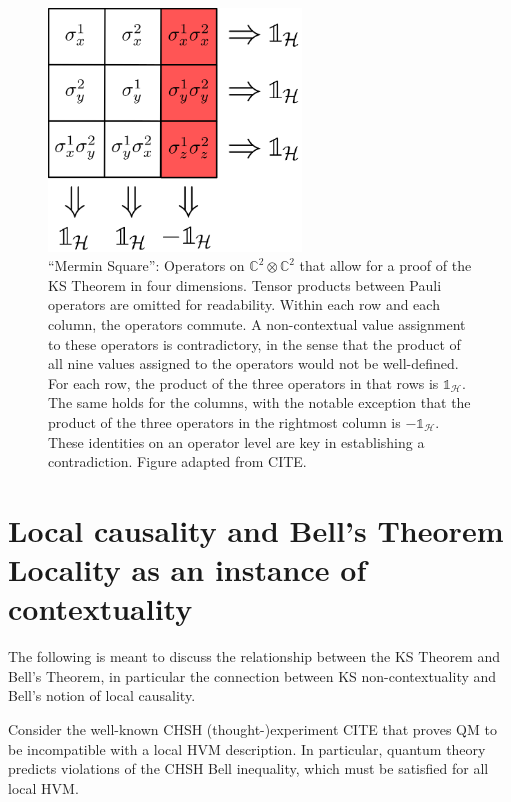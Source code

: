 \begin{figure}
    \centering
    \includegraphics[width=0.6\textwidth]{images/4dim.png}
    \caption{``Mermin Square'': Operators on $\mathbb{C}^{2}\otimes\mathbb{C}^{2}$ that allow for a proof of the KS Theorem in four dimensions. Tensor products between Pauli operators are omitted for readability. Within each row and each column, the operators commute. A non-contextual value assignment to these operators is contradictory, in the sense that the product of all nine values assigned to the operators would not be well-defined. For each row, the product of the three operators in that rows is $\mathbb{1}_\mathcal{H}$. The same holds for the columns, with the notable exception that the product of the three operators in the rightmost column is $-\mathbb{1}_\mathcal{H}$. These identities on an operator level are key in establishing a contradiction. Figure adapted from CITE.}
    \label{fig:4dim}
\end{figure}

\section[Local causality and Bell's Theorem\\ Locality as an instance of KS]{Local causality and Bell's Theorem\\ \large{Locality as an instance of contextuality}}

\label{sec:bell}
The following is meant to discuss the relationship between the KS Theorem and Bell's Theorem, in particular the connection between KS non-contextuality and Bell's notion of local causality. 

Consider the well-known CHSH (thought-)experiment CITE that proves QM to be incompatible with a local HVM description. In particular, quantum theory predicts violations of the CHSH Bell inequality, which must be satisfied for all local HVM.


